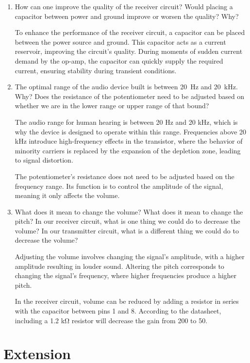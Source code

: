 \documentclass[12pt]{article}
\begin{document}
\begin{enumerate}
\item How can one improve the quality of the receiver circuit? Would placing a capacitor between power and ground improve or worsen the quality? Why?

To enhance the performance of the receiver circuit, a capacitor can be placed between the power source and ground. This capacitor acts as a current reservoir, improving the circuit's quality. During moments of sudden current demand by the op-amp, the capacitor can quickly supply the required current, ensuring stability during transient conditions.

\item The optimal range of the audio device built is between \SI{20}{\hertz} and \SI{20}{\kilo\hertz}.  Why? Does the resistance of the potentiometer need to be adjusted based on whether we are in the lower range or upper range of that bound?

The audio range for human hearing is between 20 Hz and 20 kHz, which is why the device is designed to operate within this range. Frequencies above 20 kHz introduce high-frequency effects in the transistor, where the behavior of minority carriers is replaced by the expansion of the depletion zone, leading to signal distortion.

The potentiometer's resistance does not need to be adjusted based on the frequency range. Its function is to control the amplitude of the signal, meaning it only affects the volume.

\item What does it mean to change the volume? What does it mean to change the pitch? In our receiver circuit, what is one thing we could do to decrease the volume? In our transmitter circuit, what is a different thing we could do to decrease the volume?

Adjusting the volume involves changing the signal's amplitude, with a higher amplitude resulting in louder sound. Altering the pitch corresponds to changing the signal's frequency, where higher frequencies produce a higher pitch. 

In the receiver circuit, volume can be reduced by adding a resistor in series with the capacitor between pins 1 and 8. According to the datasheet, including a 1.2 kΩ resistor will decrease the gain from 200 to 50.


\end{enumerate}

\section{Extension}
\end{document}
